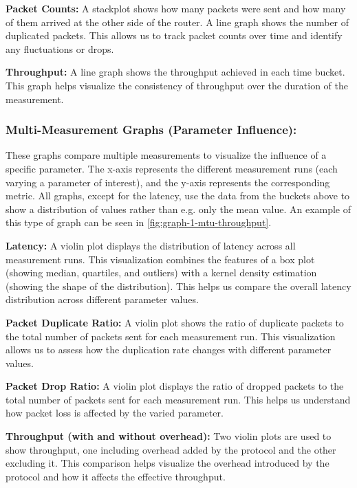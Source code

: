 \noindent\textbf{Packet Counts:} A stackplot shows how many packets were sent and how many of them arrived at the other side of the router.
A line graph shows the number of duplicated packets.
This allows us to track packet counts over time and identify any fluctuations or drops.

\noindent\textbf{Throughput:} A line graph shows the throughput achieved in each time bucket.
This graph helps visualize the consistency of throughput over the duration of the measurement.


\subsubsection{Multi-Measurement Graphs (Parameter Influence):}
These graphs compare multiple measurements to visualize the influence of a specific parameter.
The x-axis represents the different measurement runs (each varying a parameter of interest), and the y-axis represents the corresponding metric.
All graphs, except for the latency, use the data from the buckets above to show a distribution of values rather than e.g. only the mean value.
An example of this type of graph can be seen in \cref{fig:graph-1-mtu-throughput}.

\noindent\textbf{Latency:} A violin plot displays the distribution of latency across all measurement runs.
This visualization combines the features of a box plot (showing median, quartiles, and outliers) with a kernel density estimation (showing the shape of the distribution).
This helps us compare the overall latency distribution across different parameter values.

\noindent\textbf{Packet Duplicate Ratio:} A violin plot shows the ratio of duplicate packets to the total number of packets sent for each measurement run.
This visualization allows us to assess how the duplication rate changes with different parameter values.

\noindent\textbf{Packet Drop Ratio:} A violin plot displays the ratio of dropped packets to the total number of packets sent for each measurement run.
This helps us understand how packet loss is affected by the varied parameter.

\noindent\textbf{Throughput (with and without overhead):} Two violin plots are used to show throughput, one including overhead added by the protocol and the other excluding it.
This comparison helps visualize the overhead introduced by the protocol and how it affects the effective throughput.

